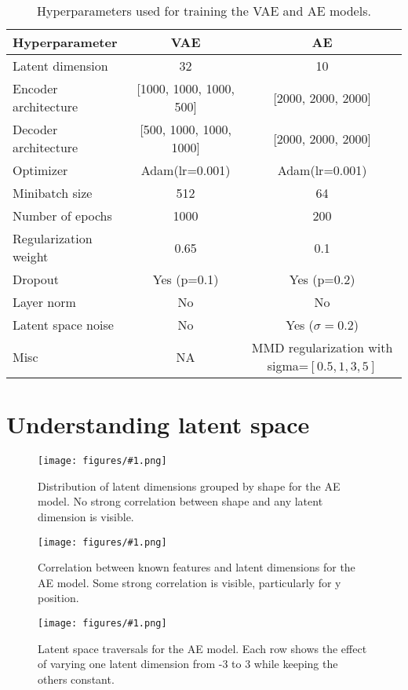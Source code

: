 \documentclass[conference,a4paper]{IEEEtran}
\newcommand{\centerfigure}[2]{
    \begin{figure}[htbp]
        \centering
        \texttt{[image: figures/\#1.png]}
        \caption{#2}
        \label{fig:#1}
    \end{figure}
}
\begin{document}
\begin{table}[htbp]
\caption{Hyperparameters used for training the VAE and AE models.}
\label{tab:hyperparams}
\centering
\begin{tabular}{l|c|c}
\toprule
\textbf{Hyperparameter} & \textbf{VAE} & \textbf{AE} \\
\midrule
Latent dimension & 32 & 10 \\
Encoder architecture & [1000, 1000, 1000, 500] & [2000, 2000, 2000] \\
Decoder architecture & [500, 1000, 1000, 1000] & [2000, 2000, 2000] \\
Optimizer & Adam(lr=0.001) & Adam(lr=0.001) \\
Minibatch size & 512 & 64 \\
Number of epochs & 1000 & 200 \\
Regularization weight & 0.65 & 0.1 \\
Dropout & Yes (p=0.1) & Yes (p=0.2) \\
Layer norm & No & No \\
Latent space noise & No & Yes ($\sigma=0.2$) \\
Misc & NA & MMD regularization with sigma=$[0.5,1,3,5]$\\
\bottomrule
\end{tabular}
\end{table}

\section{Understanding latent space}

\centerfigure{ae-latent-by-shape}{Distribution of latent dimensions grouped by shape for the AE model. No strong correlation between shape and any latent dimension is visible.}

\centerfigure{ae-latent-corelation}{Correlation between known features and latent dimensions for the AE model. Some strong correlation is visible, particularly for y position.}

\centerfigure{ae-traversal-1}{Latent space traversals for the AE model. Each row shows the effect of varying one latent dimension from -3 to 3 while keeping the others constant.}
\end{document}
